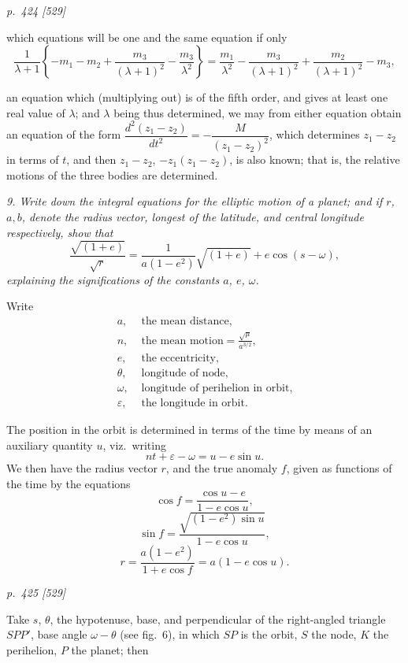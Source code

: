 \documentclass[11pt,a4paper]{article}
\theoremstyle{plain}
\theoremstyle{definition}
\begin{document}
\clearpage

\bigskip
\textit{p.~424 [529]}
\smallskip

which equations will be one and the same equation if only
\[
\frac{1}{\lambda + 1}\left\{- m_1 - m_2 + \frac{m_3}{(\lambda + 1)^2} - \frac{m_3}{\lambda^2}\right\} = \frac{m_1}{\lambda^2} - \frac{m_3}{(\lambda + 1)^2} + \frac{m_2}{(\lambda + 1)^2} - m_3 ,
\]

\noindent
an equation which (multiplying out) is of the fifth order, and gives at least one real
value of $\lambda$; and $\lambda$ being thus determined, we may from either equation obtain an
equation of the form $\dfrac{d^2(z_1 - z_2)}{dt^2} = -\dfrac{M}{(z_1 - z_2)^2}$, which determines $z_1 - z_2$ in terms of $t$, and
then $z_1 - z_2$, $-z_1 (z_1 - z_2)$, is also known; that is, the relative motions of the three bodies
are determined.

\textit{9. Write down the integral equations for the elliptic motion of a planet; and if $r$, $a, b$, denote the radius vector, longest of the latitude, and central longitude respectively, show that}
\[
\frac{\sqrt{(1 + e)}}{\sqrt{r}} = \frac{1}{a(1 - e^2)} \sqrt{(1 + e)} + e\cos(s - \omega),
\]
\textit{explaining the significations of the constants $a$, $e$, $\omega$.}

Write
\begin{align*}
a, & \text{ the mean distance,}\\
n, & \text{ the mean motion} = \frac{\sqrt{\mu}}{a^{3/2}},\\
e, & \text{ the eccentricity,}\\
\theta, & \text{ longitude of node,}\\
\omega, & \text{ longitude of perihelion in orbit,}\\
\varepsilon, & \text{ the longitude in orbit.}
\end{align*}

The position in the orbit is determined in terms of the time by means of an
auxiliary quantity $u$, viz.\ writing
\[
nt + \varepsilon - \omega = u - e\sin u .
\]
We then have the radius vector $r$, and the true anomaly $f$, given as functions of the
time by the equations
\[
\cos f = \frac{\cos u - e}{1 - e\cos u},
\]
\[
\sin f = \frac{\sqrt{(1 - e^2)\sin u}}{1 - e\cos u},
\]
\[
r = \frac{a(1 - e^2)}{1 + e\cos f} = a(1 - e\cos u).
\]

\clearpage

\bigskip
\textit{p.~425 [529]}
\smallskip

Take $s$, $\theta$, the hypotenuse, base, and perpendicular of the right-angled triangle $SPP'$, base angle $\omega - \theta$ (see fig.~6), in which $SP$ is the orbit, $S$ the node, $K$ the perihelion, $P$ the planet; then
\end{document}
